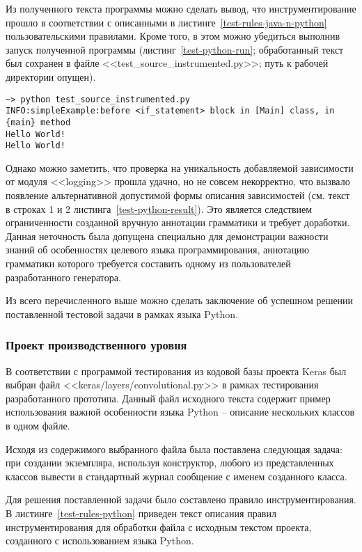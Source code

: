 Из полученного текста программы можно сделать вывод, что инструментирование прошло в соответствии с описанными в листинге~\ref{test-rules-java-n-python} пользовательскими правилами.
Кроме того, в этом можно убедиться выполнив запуск полученной программы (листинг~\ref{test-python-run}; обработанный текст был сохранен в файле <<test\_source\_instrumented.py>>; путь к рабочей директории опущен).

\begin{lstlisting}[frame=single, label={test-python-run}, caption={Результаты запуска обработанного тестового приложения.}]
~> python test_source_instrumented.py
INFO:simpleExample:before <if_statement> block in [Main] class, in {main} method
Hello World!
Hello World!
\end{lstlisting}

Однако можно заметить, что проверка на уникальность добавляемой зависимости от модуля <<logging>> прошла удачно, но не совсем некорректно, что вызвало появление альтернативной допустимой формы описания зависимостей (см. текст в строках 1 и 2 листинга~\ref{test-python-result}).
Это является следствием ограниченности созданной вручную аннотации грамматики и требует доработки.
Данная неточность была допущена специально для демонстрации важности знаний об особенностях целевого языка программирования, аннотацию грамматики которого требуется составить одному из пользователей разработанного генератора.

Из всего перечисленного выше можно сделать заключение об успешном решении поставленной тестовой задачи в рамках языка Python.

\subsubsection{Проект производственного уровня}

В соответствии с программой тестирования из кодовой базы проекта Keras был выбран файл <<keras/layers/convolutional.py>> в рамках тестирования разработанного прототипа.
Данный файл исходного текста содержит пример использования важной особенности языка Python -- описание нескольких классов в одном файле.

Исходя из содержимого выбранного файла была поставлена следующая задача:
при создании экземпляра, используя конструктор, любого из представленных классов вывести в стандартный журнал сообщение с именем созданного класса.

Для решения поставленной задачи было составлено правило инструментирования.
В листинге~\ref{test-rules-python} приведен текст описания правил инструментирования для обработки файла с исходным текстом проекта, созданного с использованием языка Python.

